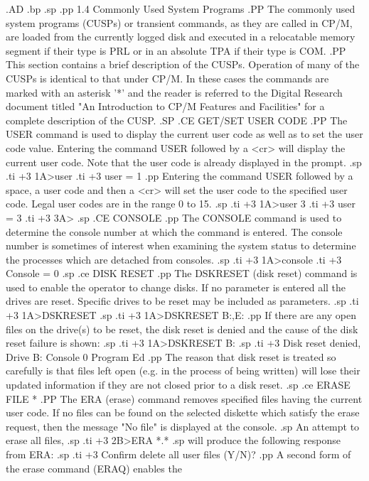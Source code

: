 .AD
.bp
.sp
.pp
1.4  Commonly Used System Programs
.PP
The commonly used system programs (CUSPs) or transient commands, as
they are called in CP/M, are loaded from the currently logged
disk and executed in a relocatable memory segment if their type is
PRL or in an absolute TPA if their type is COM.
.PP
This section contains a brief description of the CUSPs.  Operation of
many of the CUSPs is identical to that under CP/M.  In these cases
the commands are marked with an asterisk '*' and
the reader is referred to the Digital Research document titled "An
Introduction to CP/M Features and Facilities" for a complete
description of the CUSP.
.SP
.CE
GET/SET USER CODE
.PP
The USER command is used to display the current user code as well as
to set the user code value.
Entering the command USER followed by a <cr> will display the
current user code.
Note that the user code is already displayed in the prompt.
.sp
.ti +3
1A>user
.ti +3
user = 1
.pp
Entering the command USER followed by a space, a user code and then
a <cr> will set the user code to the specified user code.  Legal user
codes are in the range 0 to 15.
.sp
.ti +3
1A>user 3
.ti +3
user = 3
.ti +3
3A>
.sp
.CE
CONSOLE
.pp
The CONSOLE command is used to determine the console number at
which the command is entered.  The console number is sometimes of
interest when examining the system status to determine the processes
which are detached from consoles.
.sp
.ti +3
1A>console
.ti +3
Console = 0
.sp
.ce
DISK RESET
.pp
The  DSKRESET  (disk reset) command is used to  enable  the
operator to change disks.   If no parameter is entered  all
the  drives are reset.   Specific drives to be reset may be
included as parameters.
.sp
.ti +3
1A>DSKRESET
.sp
.ti +3
1A>DSKRESET  B:,E:
.pp
If  there are any open files on the drive(s) to  be  reset,
the  disk  reset is denied and the cause of the disk  reset
failure is shown:
.sp
.ti +3
1A>DSKRESET B:
.sp
.ti +3
Disk reset denied, Drive B: Console 0 Program Ed
.pp
The reason that disk reset is treated so carefully is  that
files left open (e.g. in the process of being written) will
lose their updated information if they are not closed prior
to a disk reset.
.sp
.ce
ERASE FILE *
.PP
The ERA (erase) command removes specified files having the current
user code.
If no files can be found on the selected diskette which satisfy the
erase request, then the message "No file" is displayed at the console.
.sp
An attempt to erase all files,
.sp
.ti +3
2B>ERA *.*
.sp
will produce the following response from ERA:
.sp
.ti +3
Confirm delete all user files (Y/N)?
.pp
A  second  form  of the erase command  (ERAQ)  enables  the
